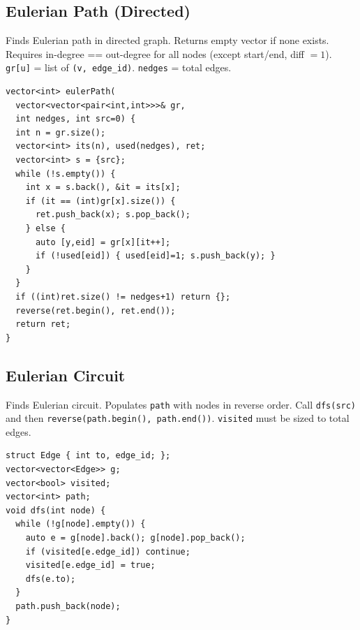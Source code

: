 \subsection{Eulerian Path (Directed)}
Finds Eulerian path in directed graph. Returns empty vector if none exists. Requires in-degree == out-degree for all nodes (except start/end, diff $= 1$). \texttt{gr[u]} = list of \texttt{(v, edge\_id)}. \texttt{nedges} = total edges.
\begin{verbatim}
vector<int> eulerPath(
  vector<vector<pair<int,int>>>& gr,
  int nedges, int src=0) {
  int n = gr.size();
  vector<int> its(n), used(nedges), ret;
  vector<int> s = {src};
  while (!s.empty()) {
    int x = s.back(), &it = its[x];
    if (it == (int)gr[x].size()) {
      ret.push_back(x); s.pop_back();
    } else {
      auto [y,eid] = gr[x][it++];
      if (!used[eid]) { used[eid]=1; s.push_back(y); }
    }
  }
  if ((int)ret.size() != nedges+1) return {};
  reverse(ret.begin(), ret.end());
  return ret;
}
\end{verbatim}
\subsection{Eulerian Circuit}
Finds Eulerian circuit. Populates \texttt{path} with nodes in reverse order. Call \texttt{dfs(src)} and then \texttt{reverse(path.begin(), path.end())}. \texttt{visited} must be sized to total edges.
\begin{verbatim}
struct Edge { int to, edge_id; };
vector<vector<Edge>> g;
vector<bool> visited;
vector<int> path;
void dfs(int node) {
  while (!g[node].empty()) {
    auto e = g[node].back(); g[node].pop_back();
    if (visited[e.edge_id]) continue;
    visited[e.edge_id] = true;
    dfs(e.to);
  }
  path.push_back(node);
}
\end{verbatim}
